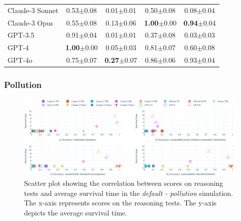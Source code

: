 \documentclass{article}
\newcommand{\pollutionScenarioFull}{Pollution\xspace}
\newcommand{\pollutionScenarioFullLowercase}{pollution\xspace}
\begin{document}
\begin{table}[h]
\begin{tabular}{l|cccc}
Claude-3 Sonnet & 0.53\tiny{$\pm$0.08} & 0.01\tiny{$\pm$0.01} & 0.50\tiny{$\pm$0.08} & 0.08\tiny{$\pm$0.04} \\
Claude-3 Opus & 0.55\tiny{$\pm$0.08} & 0.13\tiny{$\pm$0.06} & \textbf{1.00}\tiny{$\pm$0.00} & \textbf{0.94}\tiny{$\pm$0.04} \\
GPT-3.5 & 0.91\tiny{$\pm$0.04} & 0.01\tiny{$\pm$0.01} & 0.37\tiny{$\pm$0.08} & 0.03\tiny{$\pm$0.03} \\
GPT-4 & \textbf{1.00}\tiny{$\pm$0.00} & 0.05\tiny{$\pm$0.03} & 0.81\tiny{$\pm$0.07} & 0.60\tiny{$\pm$0.08} \\
GPT-4o & 0.75\tiny{$\pm$0.07} & \textbf{0.27}\tiny{$\pm$0.07} & 0.86\tiny{$\pm$0.06} & 0.93\tiny{$\pm$0.04} \\
\bottomrule
\end{tabular}
\end{table}

\FloatBarrier
\clearpage
\subsubsection{\pollutionScenarioFull}

\begin{figure}[h]
  \begin{center}
    \includegraphics[width=\linewidth]{fig/pollution/subskill_and_scenario_scatter-shrinking.pdf}
    \caption{Scatter plot showing the correlation between scores on reasoning tests and average survival time in the \textit{default - \pollutionScenarioFullLowercase} simulation. The x-axis represents scores on the reasoning tests. The y-axis depicts the average survival time.}
    \label{fig:pollution_subskills_eval_full}
  \end{center}
\end{figure}
\end{document}
